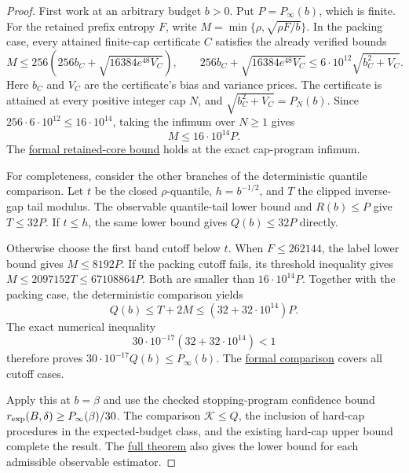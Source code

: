 \begin{proof}
First work at an arbitrary budget $b>0$. Put
$P=P_\infty(b)$, which is finite. For the retained prefix entropy
$F$, write $M=\min\{\rho,\sqrt{\rho F/b}\}$.
In the packing case, every attained finite-cap certificate $C$
satisfies the already verified bounds
\[
 M\le256\left(256b_C+
          \sqrt{16384e^{48}V_C}\right),\qquad
 256b_C+\sqrt{16384e^{48}V_C}
 \le6\cdot10^{12}\sqrt{b_C^2+V_C}.
\]
Here $b_C$ and $V_C$ are the certificate's bias and variance prices.
The certificate is attained at every positive integer cap $N$,
and $\sqrt{b_C^2+V_C}=P_N(b)$.
Since $256\cdot6\cdot10^{12}\le16\cdot10^{14}$, taking the
infimum over $N\ge1$ gives
\[
 M\le16\cdot10^{14}P.
\]
The
\href{https://github.com/davidiach/adaptive-threshold-estimation/blob/0feee44f1e6dbdee6e3d8edb6c11eec2bc39ed60/lean/ThresholdHC/ConfidenceEntropy/Core.lean}{formal retained-core bound}
holds at the exact cap-program infimum.

For completeness, consider the other branches of the deterministic
quantile comparison. Let $t$ be the closed $\rho$-quantile,
$h=b^{-1/2}$, and $T$ the clipped inverse-gap tail modulus.
The observable quantile-tail lower bound and $R(b)\le P$ give
$T\le32P$. If $t\le h$, the same lower bound gives
$Q(b)\le32P$ directly.

Otherwise choose the first band cutoff below $t$.
When $F\le262144$, the label lower bound gives
$M\le8192P$. If the packing cutoff fails, its threshold
inequality gives
$M\le2097152T\le67108864P$.
Both are smaller than $16\cdot10^{14}P$.
Together with the packing case, the deterministic comparison yields
\[
 Q(b)\le T+2M
 \le(32+32\cdot10^{14})P.
\]
The exact numerical inequality
\[
 30\cdot10^{-17}(32+32\cdot10^{14})<1
\]
therefore proves $30\cdot10^{-17}Q(b)\le P_\infty(b)$.
The
\href{https://github.com/davidiach/adaptive-threshold-estimation/blob/0feee44f1e6dbdee6e3d8edb6c11eec2bc39ed60/lean/ThresholdHC/ConfidenceEntropy/Program.lean}{formal comparison}
covers all cutoff cases.

Apply this at $b=\beta$ and use the checked stopping-program
confidence bound
$r_{\rm exp}(B,\delta)\ge P_\infty(\beta)/30$.
The comparison $\mathcal K\le Q$, the inclusion of hard-cap
procedures in the expected-budget class, and the existing
hard-cap upper bound complete the result. The
\href{https://github.com/davidiach/adaptive-threshold-estimation/blob/0feee44f1e6dbdee6e3d8edb6c11eec2bc39ed60/lean/ThresholdHC/ConfidenceEntropy/Full.lean}{full theorem}
also gives the lower bound for each admissible observable estimator.
\end{proof}
